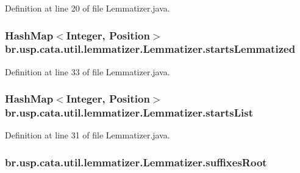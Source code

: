 Definition at line 20 of file Lemmatizer.\+java.

\hypertarget{classbr_1_1usp_1_1cata_1_1util_1_1lemmatizer_1_1_lemmatizer_ace928e8e1187785e623af7d55f68db32}{
\subsubsection[{starts\+Lemmatized}]{\setlength{\rightskip}{0pt plus 5cm}Hash\+Map$<$Integer, {\bf Position}$>$ br.\+usp.\+cata.\+util.\+lemmatizer.\+Lemmatizer.\+starts\+Lemmatized\hspace{0.3cm}{\ttfamily [private]}}}\label{classbr_1_1usp_1_1cata_1_1util_1_1lemmatizer_1_1_lemmatizer_ace928e8e1187785e623af7d55f68db32}


Definition at line 33 of file Lemmatizer.\+java.

\hypertarget{classbr_1_1usp_1_1cata_1_1util_1_1lemmatizer_1_1_lemmatizer_a35596ef32451200dea1d847f77ca81dd}{
\subsubsection[{starts\+List}]{\setlength{\rightskip}{0pt plus 5cm}Hash\+Map$<$Integer, {\bf Position}$>$ br.\+usp.\+cata.\+util.\+lemmatizer.\+Lemmatizer.\+starts\+List\hspace{0.3cm}{\ttfamily [private]}}}\label{classbr_1_1usp_1_1cata_1_1util_1_1lemmatizer_1_1_lemmatizer_a35596ef32451200dea1d847f77ca81dd}


Definition at line 31 of file Lemmatizer.\+java.

\hypertarget{classbr_1_1usp_1_1cata_1_1util_1_1lemmatizer_1_1_lemmatizer_a24b4a3b79f50680ad63ed74a3a7bd9bd}{
\subsubsection[{suffixes\+Root}]{ br.\+usp.\+cata.\+util.\+lemmatizer.\+Lemmatizer.\+suffixes\+Root\hspace{0.3cm}{\ttfamily [private]}}}\label{classbr_1_1usp_1_1cata_1_1util_1_1lemmatizer_1_1_lemmatizer_a24b4a3b79f50680ad63ed74a3a7bd9bd}


